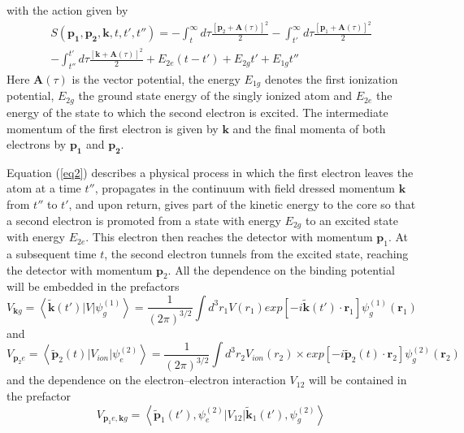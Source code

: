 \documentclass[11pt]{article}
\numberwithin{equation}{section}
\begin{document}
with the action given by 
\begin{multline} \label{eq3}
    S(\mathbf{p_1},\mathbf{p_2},\mathbf{k},t,t',t'') = -\int_{t}^{\infty} d\tau \frac{[\mathbf{p}_2 + \mathbf{A}(\tau)]^2}{2} - \int_{t'}^{\infty} d\tau \frac{[\mathbf{p}_1 + \mathbf{A}(\tau)]^2}{2} \\
    - \int_{t''}^{t'} d\tau \frac{[\mathbf{k} + \mathbf{A}(\tau)]^2}{2} + E_{2e}(t-t') + E_{2g}t' + E_{1g}t''
\end{multline}
\newline
Here $\mathbf{A}(\tau)$ is the vector potential, the energy $E_{1g}$ denotes the first ionization potential, $E_{2g}$ the ground state energy of the singly ionized atom and $E_{2e}$ the energy of the state to which the second electron is excited. The intermediate momentum of the first electron is given by $\mathbf{k}$ and the final momenta of both electrons by $\mathbf{p_1}$ and $\mathbf{p_2}$.
\par
Equation (\ref{eq2}) describes a physical process in which the first electron leaves the atom at a time $t''$, propagates in the continuum with field dressed momentum $\mathbf{k}$ from $t''$ to $t'$, and upon return, gives part of the kinetic energy to the core so that a second electron is promoted from a state with energy $E_{2g}$ to an excited state with energy $E_{2e}$. This electron then reaches the detector with momentum $\mathbf{p}_1$. At a subsequent time $t$, the second electron tunnels from the excited state, reaching the detector with momentum $\mathbf{p}_2$. 
\newline
All the dependence on the binding potential will be embedded in the prefactors
\begin{equation}\label{eq4}
    V_{\mathbf{k}g} = \left \langle \tilde{\mathbf{k}}(t')|V|\psi_g^{(1)}\right \rangle = \frac{1}{(2\pi)^{3/2}} \int d^3r_1 V(r_1)exp[-i\tilde{\mathbf{k}}(t') \cdot \mathbf{r}_1]\psi_g^{(1)}(\mathbf{r}_1)
\end{equation}
and
\begin{equation} \label{eq5}
    V_{\mathbf{p}_2e} = \left \langle \tilde{\mathbf{p}}_2(t)|V_{ion}|\psi_e^{(2)}\right \rangle = \frac{1}{(2\pi)^{3/2}} \int d^3r_2 V_{ion}(r_2) \times exp[-i\tilde{\mathbf{p}}_2(t) \cdot \mathbf{r}_2]\psi_g^{(2)}(\mathbf{r}_2)
\end{equation}
and the dependence on the electron–electron interaction $V_{12}$ will be contained in the prefactor
\begin{equation} \label{eq6}
    V_{\mathbf{p}_1e,\mathbf{k}g} = \left \langle \tilde{\mathbf{p}}_1(t'),\psi_e^{(2)}|V_{12}|\tilde{\mathbf{k}}_1(t'), \psi_g^{(2)}\right \rangle 
\end{equation}
\end{document}
